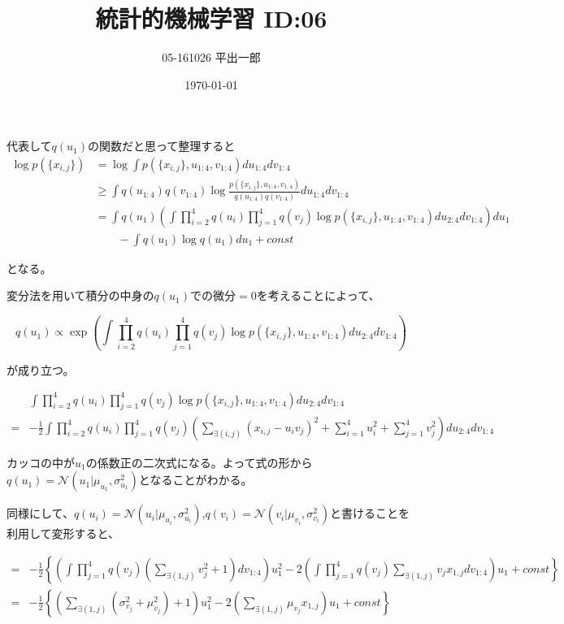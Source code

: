 \documentclass[a4j]{jarticle}
\title{統計的機械学習 ID:06}
\author{05-161026 平出一郎}
\date{\today}
\begin{document}
\thispagestyle{empty}
\maketitle
\pagebreak


代表して$q(u_1)$の関数だと思って整理すると
\begin{align*}
\log p(\{x_{i,j}\}) &= \log\int p(\{x_{i,j}\},u_{1:4},v_{1:4})du_{1:4}dv_{1:4} \\
&\geq \int q(u_{1:4})q(v_{1:4})\log \frac{p(\{x_{i,j}\},u_{1:4},v_{1:4})}{q(u_{1:4})q(v_{1:4})}du_{1:4}dv_{1:4} \\
&= \int q(u_1) \left( \int \prod_{i=2}^4q(u_i)\prod_{j=1}^4q(v_j) \log p(\{x_{i,j}\},u_{1:4},v_{1:4}) du_{2:4}dv_{1:4} \right) du_1 \\
&\quad\quad-\int q(u_1) \log q(u_1)du_1 + const
\end{align*}


となる。

変分法を用いて積分の中身の$q(u_1)$での微分$=0$を考えることによって、


$$ q(u_1) \propto \exp\left( \int \prod_{i=2}^4q(u_i)\prod_{j=1}^4q(v_j) \log p(\{x_{i,j}\},u_{1:4},v_{1:4}) du_{2:4}dv_{1:4} \right) $$

が成り立つ。

\begin{align*}
&\int \prod_{i=2}^4q(u_i)\prod_{j=1}^4q(v_j) \log p(\{x_{i,j}\},u_{1:4},v_{1:4}) du_{2:4}dv_{1:4} \\
=& - \frac{1}{2} \int \prod_{i=2}^4q(u_i)\prod_{j=1}^4q(v_j) \left( \sum_{\exists(i,j)}(x_{i,j}-u_iv_j)^2 + \sum_{i=1}^4 u_i^2 + \sum_{j=1}^4 v_j^2 \right)du_{2:4}dv_{1:4}
\end{align*}

カッコの中が$u_1$の係数正の二次式になる。よって式の形から$q(u_1) = \mathcal{N}(u_1 | \mu_{u_1}, \sigma^2_{u_1})$となることがわかる。

同様にして、$q(u_i) = \mathcal{N}(u_i | \mu_{u_i}, \sigma^2_{u_i})$,$q(v_i) = \mathcal{N}(v_i | \mu_{v_i}, \sigma^2_{v_i})$と書けることを利用して変形すると、


\begin{align*}
=& - \frac{1}{2} \left\{ \left(\int \prod_{j=1}^4q(v_j) \left( \sum_{\exists(1,j)}v_j^2 + 1 \right)dv_{1:4} \right) u_1^2  -2 \left( \int \prod_{j=1}^4q(v_j) \sum_{\exists(1,j)} v_jx_{1,j} dv_{1:4} \right) u_1 + const \right\} \\
=& - \frac{1}{2} \left\{ \left( \sum_{\exists(1,j)} \left(\sigma^2_{v_j}+\mu^2_{v_j} \right) + 1 \right) u_1^2 -2 \left( \sum_{\exists(1,j)} \mu_{v_j}x_{1,j} \right)u_1 + const \right\}
\end{align*}
\end{document}
